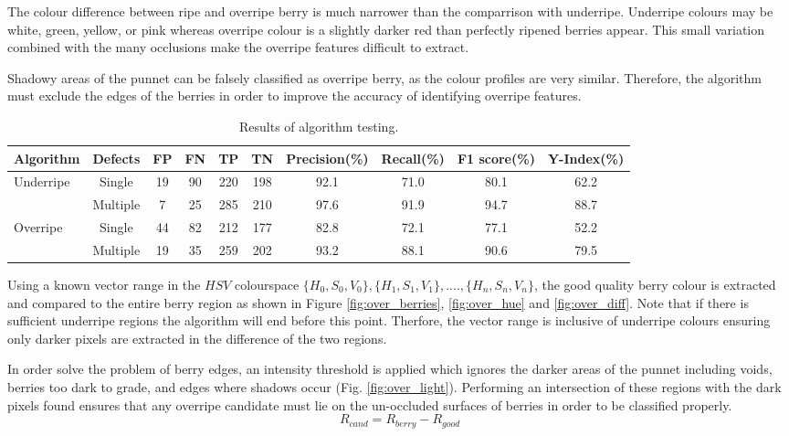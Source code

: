 \documentclass[conference]{IEEEtran}
\begin{document}
The colour difference between ripe and overripe berry is much narrower than the comparrison with underripe. Underripe colours may be white, green, yellow, or pink whereas overripe colour is a slightly darker red than perfectly ripened berries appear. This small variation combined with the many occlusions make the overripe features difficult to extract.

Shadowy areas of the punnet can be falsely classified as overripe berry, as the colour profiles are very similar. Therefore, the algorithm must exclude the edges of the berries in order to improve the accuracy of identifying overripe features. 

\begin{table}
	\caption{Results of algorithm testing.}
	\label{tab:algo_test}
	\begin{tabularx}{\textwidth}{@{}l*{8}{C}c@{}}
		\toprule
		Algorithm & Defects & FP  & FN  & TP  & TN  & Precision(\%) & Recall(\%) & F1 score(\%) & Y-Index(\%)\\ 
		\midrule
		Underripe   & Single   & 19 & 90 & 220 & 198 & 92.1 & 71.0 & 80.1 & 62.2 \\[6pt] 
		& Multiple & 7  & 25 & 285 & 210 & 97.6 & 91.9 & 94.7 & 88.7 \\[6pt]
		Overripe    & Single   & 44 & 82 & 212 & 177 & 82.8 & 72.1 & 77.1 & 52.2 \\[6pt]
		& Multiple & 19 & 35 & 259 & 202 & 93.2 & 88.1 & 90.6 & 79.5 \\[6pt]	 
		\bottomrule
	\end{tabularx}
\end{table}

Using a known vector range in the $HSV$ colourspace $\{H_0, S_0, V_0\}, \{H_1, S_1, V_1\},....,\{H_n, S_n, V_n\}$, the good quality berry colour is  extracted and compared to the entire berry region as shown in Figure \ref{fig:over_berries}, \ref{fig:over_hue} and \ref{fig:over_diff}. Note that if there is sufficient underripe regions the algorithm will end before this point. Therfore, the vector range is inclusive of underripe colours ensuring only darker pixels are extracted in the difference of the two regions.


In order solve the problem of berry edges, an intensity threshold is applied which ignores the darker areas of the punnet including voids, berries too dark to grade, and edges where shadows occur (Fig. \ref{fig:over_light}). Performing an intersection of these regions with the dark pixels found ensures that any overripe candidate must lie on the un-occluded surfaces of berries in order to be classified properly. 
\begin{equation}
R_{cand} = R_{berry} - R_{good}
\label{diff_berry_hue}
\end{equation}
\end{document}
